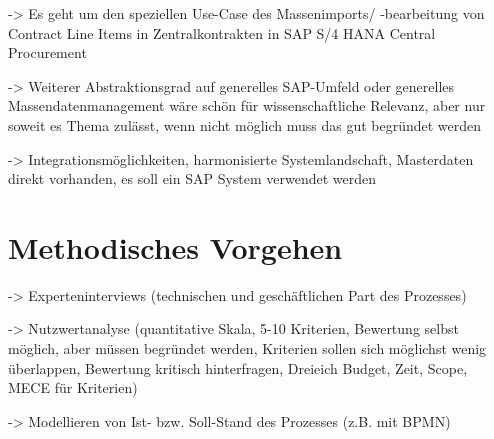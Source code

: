 -> Es geht um den speziellen Use-Case des Massenimports/ -bearbeitung von Contract Line Items in Zentralkontrakten in SAP S/4 HANA Central Procurement 

-> Weiterer Abstraktionsgrad auf generelles SAP-Umfeld oder generelles Massendatenmanagement wäre schön für wissenschaftliche Relevanz, aber nur soweit es Thema zulässt, wenn nicht möglich muss das gut begründet werden

-> Integrationsmöglichkeiten, harmonisierte Systemlandschaft, Masterdaten direkt vorhanden, es soll ein SAP System verwendet werden
\section{Methodisches Vorgehen}

-> Experteninterviews (technischen und geschäftlichen Part des Prozesses)


-> Nutzwertanalyse (quantitative Skala, 5-10 Kriterien, Bewertung selbst möglich, aber müssen begründet werden, Kriterien sollen sich möglichst wenig überlappen, Bewertung kritisch hinterfragen, Dreieich Budget, Zeit, Scope, MECE für Kriterien)

-> Modellieren von Ist- bzw. Soll-Stand des Prozesses (z.B. mit BPMN)